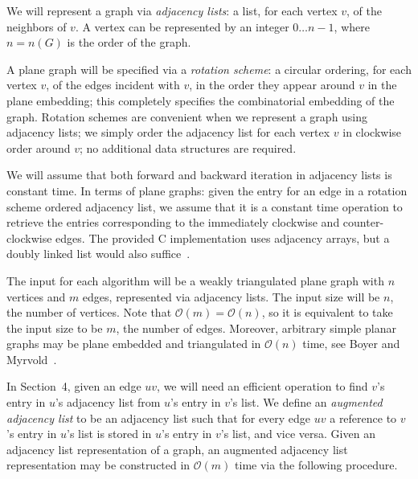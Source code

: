 \documentclass[12pt,letterpaper]{article}
\theoremstyle{plain}
\theoremstyle{definition}
\theoremstyle{break}
\newcommand{\defterm}[1]{\emph{#1}} %
\begin{document}
We will represent a graph via \textit{adjacency lists}:
a list, for each vertex $v$, of the neighbors of $v$.
A vertex can be represented by an integer $0\dots n-1$,
where $n=n(G)$ is the order of the graph.

A plane graph will be specified via
a \defterm{rotation scheme}:
a circular ordering,
for each vertex $v$, of the edges incident with $v$,
in the order they appear around $v$ in the plane embedding;
this completely specifies
the combinatorial embedding of the graph.
Rotation schemes are convenient when we represent a graph
using adjacency lists;
we simply order the adjacency
list for each vertex $v$ in clockwise order around $v$;
no additional data structures are required.

We will assume that both forward and backward iteration in adjacency lists
is constant time. In terms of plane graphs: given the entry for an edge in a
rotation scheme ordered adjacency list, we assume that it is a
constant time operation to retrieve the entries corresponding to the
immediately clockwise and counter-clockwise edges. The provided
C implementation uses adjacency arrays, but a doubly linked list
would also suffice~\cite{Bro2017}.

The input for each algorithm will be a weakly triangulated plane graph with
$n$ vertices and $m$ edges, represented
via adjacency lists. The input size will be $n$, the number of vertices. Note
that $\mathcal{O}(m)=\mathcal{O}(n)$, so it is equivalent to take the input size
to be $m$, the number of edges. Moreover, arbitrary simple planar graphs may be
plane embedded and triangulated in $\mathcal{O}(n)$ time, see Boyer and
Myrvold~\cite{BoMy2004}.

In Section~4, given an edge $uv$, we will need an efficient operation to
find $v$'s entry in $u$'s adjacency list from $u$'s entry in $v$'s list.
We define an \defterm{augmented adjacency list} to be an adjacency list such
that for
every edge $uv$ a reference to $v$'s entry in
$u$'s list is stored in $u$'s entry in $v$'s list, and vice versa. Given an
adjacency list representation of a graph, an augmented
adjacency list representation may be constructed in $\mathcal{O}(m)$ time via
the following procedure.
\end{document}
